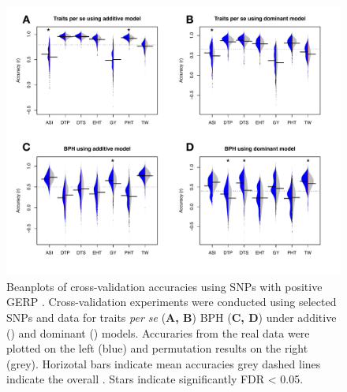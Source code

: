 \documentclass[9pt,twocolumn,twoside]{gsajnl}
\begin{document}
\DIFaddend \begin{figure}[htbp]
\centering
\DIFdelbeginFL \DIFdelendFL \DIFaddbeginFL \includegraphics[width=\linewidth]{Figure_gerpall_m.pdf}
\DIFaddendFL \caption{Beanplots of cross-validation accuracies using SNPs with positive GERP \DIFdelbeginFL {}\DIFdelendFL \DIFaddbeginFL {}\DIFaddendFL . Cross-validation experiments were conducted using selected SNPs and \DIFdelbeginFL {}\DIFdelendFL \DIFaddbeginFL {}\DIFaddendFL data \DIFdelbeginFL {}\DIFdelendFL for traits \emph{per se} (\textbf{A, B}) \DIFdelbeginFL \DIFdelFL{, }\DIFdelendFL \DIFaddbeginFL {}\DIFaddendFL BPH (\textbf{C, D}) \DIFdelbeginFL {}\textbf{}\DIFdelFL{) }\DIFdelendFL under additive (\DIFdelbeginFL \textbf{}\DIFdelendFL \DIFaddbeginFL \textbf{}\DIFaddendFL ) and dominant (\DIFdelbeginFL \textbf{}\DIFdelendFL \DIFaddbeginFL \textbf{}\DIFaddendFL ) models. Accuraries from the real data were plotted on the left \DIFdelbeginFL {}\DIFdelendFL (blue) and permutation results \DIFdelbeginFL {}\DIFdelendFL on the right (grey). Horizotal bars \DIFdelbeginFL {}\DIFdelendFL indicate mean accuracies \DIFdelbeginFL {}\DIFdelendFL \DIFaddbeginFL {}\DIFaddendFL grey dashed lines indicate the overall \DIFdelbeginFL {}\DIFdelendFL \DIFaddbeginFL {}\DIFaddendFL . Stars indicate significantly \DIFdelbeginFL {}\DIFdelendFL \DIFaddbeginFL \DIFaddFL{(}\DIFaddendFL FDR < 0.05\DIFaddbeginFL {}\DIFaddendFL .  }
\label{fig:gerpall}
\end{figure}
\end{document}
